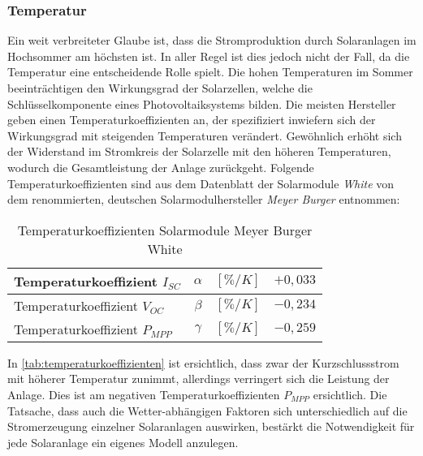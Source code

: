 \documentclass[12pt, a4paper]{article}
\begin{document}
\subsubsection{Temperatur}

Ein weit verbreiteter Glaube ist, dass die Stromproduktion durch Solaranlagen im Hochsommer am höchsten ist. In aller Regel ist dies jedoch nicht der Fall, da die Temperatur eine entscheidende Rolle spielt. Die hohen Temperaturen im Sommer beeinträchtigen den Wirkungsgrad der Solarzellen, welche die Schlüsselkomponente eines Photovoltaiksystems bilden. Die meisten Hersteller geben einen Temperaturkoeffizienten an, der spezifiziert inwiefern sich der Wirkungsgrad mit steigenden Temperaturen verändert. Gewöhnlich erhöht sich der Widerstand im Stromkreis der Solarzelle mit den höheren Temperaturen, wodurch die Gesamtleistung der Anlage zurückgeht. Folgende Temperaturkoeffizienten sind aus dem Datenblatt der Solarmodule \textit{White} von dem renommierten, deutschen Solarmodulhersteller \textit{Meyer Burger} entnommen: \newline


\begin{table}[h]
\begin{center}
\def\arraystretch{1.5}
\setlength\tabcolsep{0.75cm}
\begin{tabular}{| l | c | r | c |}
\hline
Temperaturkoeffizient $I_{SC}$ &	$\alpha$ & 	$[\%/K]$ &		$+0,033$ \\ \hline
Temperaturkoeffizient $V_{OC}$ & 	$\beta$  &	$[\%/K]$ & 		$-0,234$ \\ \hline
Temperaturkoeffizient $P_{MPP}$ & 	$\gamma$  &	$[\%/K]$ & 		$-0,259$ \\ \hline
\end{tabular}
\end{center}
\caption{Temperaturkoeffizienten Solarmodule Meyer Burger White}
\label{tab:temperaturkoeffizienten} 
\end{table}


In \autoref{tab:temperaturkoeffizienten} ist ersichtlich, dass zwar der Kurzschlussstrom mit höherer Temperatur zunimmt, allerdings verringert sich die Leistung der Anlage. Dies ist am negativen Temperaturkoeffizienten $P_{MPP}$ ersichtlich. Die Tatsache, dass auch die Wetter-abhängigen Faktoren sich unterschiedlich auf die Stromerzeugung einzelner Solaranlagen auswirken, bestärkt die Notwendigkeit für jede Solaranlage ein eigenes Modell anzulegen.
\end{document}

